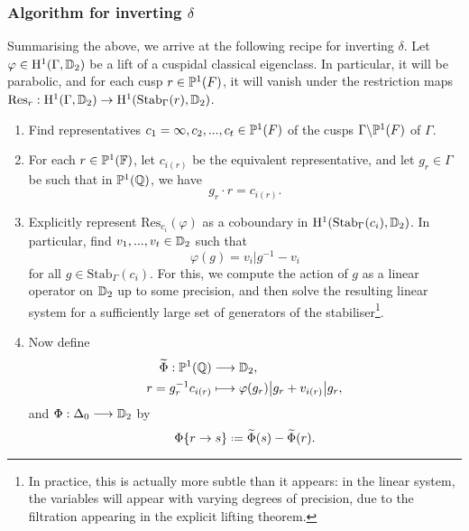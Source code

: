 \documentclass[a4paper,10pt]{article}
\numberwithin{equation}{section}
\begin{document}
\subsubsection{Algorithm for inverting $\delta$}
Summarising the above, we arrive at the following recipe for inverting $\delta$. Let $\varphi \in \mathrm{H}^1(\Gamma,\mathbb{D}_2)$ be a lift of a cuspidal classical eigenclass. In particular, it will be parabolic, and for each cusp $r \in \mathbb{P}^1(F)$, it will vanish under the restriction maps $\mathrm{Res}_r : \mathrm{H}^1(\Gamma,\mathbb{D}_2) \to \mathrm{H}^1(\mathrm{Stab}_{\Gamma}(r),\mathbb{D}_2)$.
\begin{enumerate}
	\item Find representatives $c_1 = \infty, c_2, ..., c_t \in \mathbb{P}^1(F)$ of the cusps $\Gamma\backslash\mathbb{P}^1(F)$ of $\Gamma$.
	\item For each $r \in \mathbb{P}^1(\mathbb{F})$, let $c_{i(r)}$ be the equivalent representative, and let $g_r \in \Gamma$ be such that in $\mathbb{P}^1(\mathbb{Q})$, we have
	\[
			g_r \cdot r = c_{i(r)}.
	\]
	\item Explicitly represent $\mathrm{Res}_{c_i}(\varphi)$ as a coboundary in $\mathrm{H}^1(\mathrm{Stab}_{\Gamma}(c_i), \mathbb{D}_2)$. In particular, find $v_1, ..., v_t \in \mathbb{D}_2$ such that 
	\[
		\varphi(g) = v_i|g^{-1} - v_i
	\]
	for all $g \in \mathrm{Stab}_{\Gamma}(c_i).$ For this, we compute the action of $g$ as a linear operator on $\mathbb{D}_2$ up to some precision, and then solve the resulting linear system for a sufficiently large set of generators of the stabiliser\footnote{In practice, this is actually more subtle than it appears: in the linear system, the variables will appear with varying degrees of precision, due to the filtration appearing in the explicit lifting theorem.}.
	
	\item Now define
	\begin{align*}
		\widetilde{\Phi} : \mathbb{P}^1(\mathbb{Q}) &\longrightarrow \mathbb{D}_2,\\
				r = g_r^{-1}c_{i(r)} &\longmapsto \varphi(g_r)\big|g_r + v_{i(r)}\big|g_r,
	\end{align*}
	and $\Phi : \Delta_0 \longrightarrow \mathbb{D}_2$ by
	\[
		\Phi\{r\to s\} \defeq \widetilde{\Phi}(s) - \widetilde{\Phi}(r).
	\]
\end{enumerate}	
	
\end{document}
